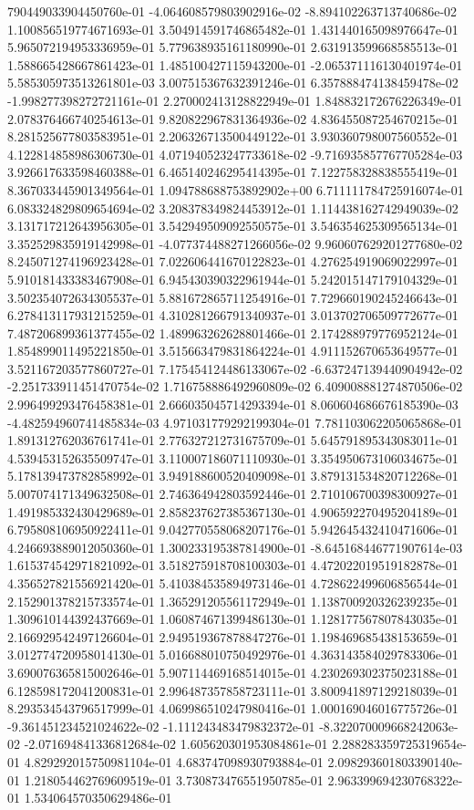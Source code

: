 790449033904450760e-01	-4.064608579803902916e-02	-8.894102263713740686e-02	1.100856519774671693e-01	3.504914591746865482e-01	1.431440165098976647e-01	5.965072194953336959e-01	5.779638935161180990e-01	2.631913599668585513e-01	1.588665428667861423e-01	1.485100427115943200e-01	-2.065371116130401974e-01	5.585305973513261801e-03	3.007515367632391246e-01	6.357888474138459478e-02	-1.998277398272721161e-01	2.270002413128822949e-01	1.848832172676226349e-01	2.078376466740254613e-01	9.820822967831364936e-02	4.836455087254670215e-01	8.281525677803583951e-01	2.206326713500449122e-01	3.930360798007560552e-01	4.122814858986306730e-01	4.071940523247733618e-02	-9.716935857767705284e-03	3.926617633598460388e-01	6.465140246295414395e-01	7.122758328838555419e-01	8.367033445901349564e-01	1.094788688753892902e+00	6.711111784725916074e-01	6.083324829809654694e-02	3.208378349824453912e-01	1.114438162742949039e-02	3.131717212643956305e-01	3.542949509092550575e-01	3.546354625309565134e-01	3.352529835919142998e-01	-4.077374488271266056e-02	9.960607629201277680e-02	8.245071274196923428e-01	7.022606441670122823e-01	4.276254919069022997e-01	5.910181433383467908e-01	6.945430390322961944e-01	5.242015147179104329e-01	3.502354072634305537e-01	5.881672865711254916e-01	7.729660190245246643e-01	6.278413117931215259e-01	4.310281266791340937e-01	3.013702706509772677e-01	7.487206899361377455e-02	1.489963262628801466e-01	2.174288979776952124e-01	1.854899011495221850e-01	3.515663479831864224e-01	4.911152670653649577e-01	3.521167203577860727e-01	7.175454124486133067e-02	-6.637247139440904942e-02	-2.251733911451470754e-02	1.716758886492960809e-02	6.409008881274870506e-02	2.996499293476458381e-01	2.666035045714293394e-01	8.060604686676185390e-03	-4.482594960741485834e-03	4.971031779292199304e-01	7.781103062205065868e-01	1.891312762036761741e-01	2.776327212731675709e-01	5.645791895343083011e-01	4.539453152635509747e-01	3.110007186071110930e-01	3.354950673106034675e-01	5.178139473782858992e-01	3.949188600520409098e-01	3.879131534820712268e-01	5.007074171349632508e-01	2.746364942803592446e-01	2.710106700398300927e-01	1.491985332430429689e-01	2.858237627385367130e-01	4.906592270495204189e-01	6.795808106950922411e-01	9.042770558068207176e-01	5.942645432410471606e-01	4.246693889012050360e-01	1.300233195387814900e-01	-8.645168446771907614e-03	1.615374542971821092e-01	3.518275918708100303e-01	4.472022019519182878e-01	4.356527821556921420e-01	5.410384535894973146e-01	4.728622499606856544e-01	2.152901378215733574e-01	1.365291205561172949e-01	1.138700920326239235e-01	1.309610144392437669e-01	1.060874671399486130e-01	1.128177567807843035e-01	2.166929542497126604e-01	2.949519367878847276e-01	1.198469685438153659e-01	3.012774720958014130e-01	5.016688010750492976e-01	4.363143584029783306e-01	3.690076365815002646e-01	5.907114469168514015e-01	4.230269302375023188e-01	6.128598172041200831e-01	2.996487357858723111e-01	3.800941897129218039e-01	8.293534543796517999e-01	4.069986510247980416e-01	1.000169046016775726e-01	-9.361451234521024622e-02	-1.111243483479832372e-01	-8.322070009668242063e-02	-2.071694841336812684e-02	1.605620301953084861e-01	2.288283359725319654e-01	4.829292015750981104e-01	4.683747098930793884e-01	2.098293601803390140e-01	1.218054462769609519e-01	3.730873476551950785e-01	2.963399694230768322e-01	1.534064570350629486e-01